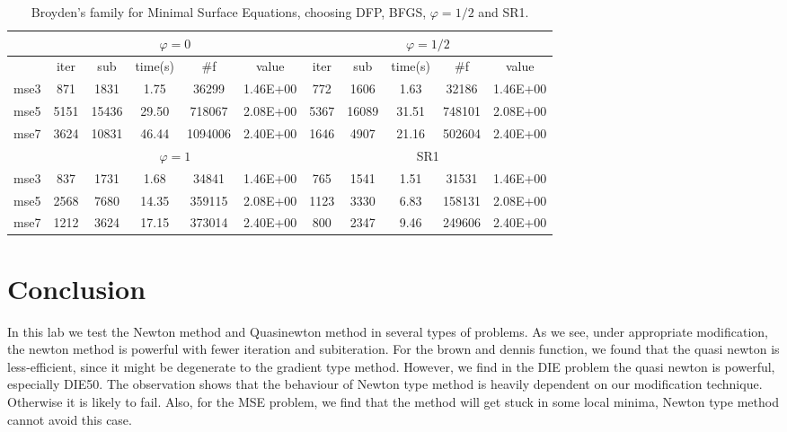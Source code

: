 \documentclass{article}
\begin{document}
\begin{table}[H]
	\centering
	\begin{tabular}{|c|c|c|c|c|c|c|c|c|c|c|}
		\hline
		& \multicolumn{5}{c|}{$\varphi = 0$}          & \multicolumn{5}{c|}{$\varphi = 1/2$}       \\ \hline
		& iter & sub   & time(s) & \#f     & value    & iter & sub   & time(s) & \#f    & value    \\ \hline
		mse3 & 871  & 1831  & 1.75    & 36299   & 1.46E+00 & 772  & 1606  & 1.63    & 32186  & 1.46E+00 \\ \hline
		mse5 & 5151 & 15436 & 29.50   & 718067  & 2.08E+00 & 5367 & 16089 & 31.51   & 748101 & 2.08E+00 \\ \hline
		mse7 & 3624 & 10831 & 46.44   & 1094006 & 2.40E+00 & 1646 & 4907  & 21.16   & 502604 & 2.40E+00 \\ \hline
		& \multicolumn{5}{c|}{$\varphi = 1$}          & \multicolumn{5}{c|}{SR1}                   \\ \hline
		mse3 & 837  & 1731  & 1.68    & 34841   & 1.46E+00 & 765  & 1541  & 1.51    & 31531  & 1.46E+00 \\ \hline
		mse5 & 2568 & 7680  & 14.35   & 359115  & 2.08E+00 & 1123 & 3330  & 6.83    & 158131 & 2.08E+00 \\ \hline
		mse7 & 1212 & 3624  & 17.15   & 373014  & 2.40E+00 & 800  & 2347  & 9.46    & 249606 & 2.40E+00 \\ \hline
	\end{tabular}
\caption{Broyden's family for Minimal Surface Equations, choosing DFP, BFGS, $\varphi = 1/2$ and SR1.}
\end{table}

\section{Conclusion}
In this lab we test the Newton method and Quasinewton method in several types of problems. As we see, under appropriate modification, the newton method is powerful with fewer iteration and subiteration. For the brown and dennis function, we found that the quasi newton is less-efficient, since it might be degenerate to the gradient type method. However, we find in the DIE problem the quasi newton is powerful, especially DIE50. The observation shows that the behaviour of Newton type method is heavily dependent on our modification technique. Otherwise it is likely to fail. Also, for the MSE problem, we find that the method will get stuck in some local minima, Newton type method cannot avoid this case.
\end{document}
